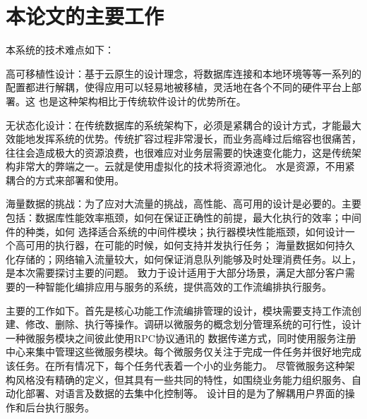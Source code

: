 %



\section{本论文的主要工作}

本系统的技术难点如下：

高可移植性设计：基于云原生的设计理念，将数据库连接和本地环境等等一系列的配置都进行解耦，使得应用可以轻易地被移植，灵活地在各个不同的硬件平台上部署。这
也是这种架构相比于传统软件设计的优势所在\cite{othe2}。

无状态化设计：在传统数据库的系统架构下，必须是紧耦合的设计方式，才能最大效能地发挥系统的优势。传统扩容过程非常漫长，而业务高峰过后缩容也很痛苦，
往往会造成极大的资源浪费，也很难应对业务层需要的快速变化能力，这是传统架构非常大的弊端之一\cite{kube2021near}。云就是使用虚拟化的技术将资源池化。
水是资源，不用紧耦合的方式来部署和使用\cite{roberson2021dbspdrp}。

海量数据的挑战：为了应对大流量的挑战，高性能、高可用的设计是必要的。主要包括：数据库性能效率瓶颈，如何在保证正确性的前提，最大化执行的效率；中间件的种类，如何
选择适合系统的中间件模块；执行器模块性能瓶颈，如何设计一个高可用的执行器，在可能的时候，如何支持并发执行任务；
海量数据如何持久化存储的；网络输入流量较大，如何保证消息队列能够及时处理消费任务。以上，是本次需要探讨主要的问题。
致力于设计适用于大部分场景，满足大部分客户需要的一种智能化编排应用与服务的系统，提供高效的工作流编排执行服务。

主要的工作如下。首先是核心功能工作流编排管理的设计，模块需要支持工作流创建、修改、删除、执行等操作。调研以微服务的概念划分管理系统的可行性，设计一种微服务模块之间彼此使用RPC协议通讯的
数据传递方式，同时使用服务注册中心来集中管理这些微服务模块\cite{jywfbpxt}。每个微服务仅关注于完成一件任务并很好地完成该任务。在所有情况下，每个任务代表着一个小的业务能力。
尽管微服务这种架构风格没有精确的定义，但其具有一些共同的特性，如围绕业务能力组织服务、自动化部署、对语言及数据的去集中化控制等\cite{wlfwyh}。
设计目的是为了解耦用户界面的操作和后台执行服务。

